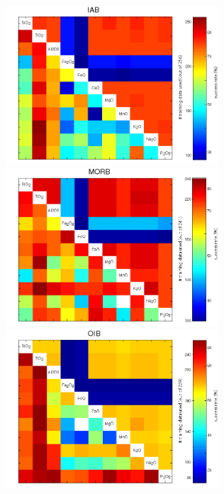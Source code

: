 \begin{figure}[htbp]
  \centering
  \includegraphics[width=300]{figures/xPlotMajor2_linear_IAB.jpg}
  \includegraphics[width=300]{figures/xPlotMajor2_linear_MORB.jpg}\\
  \includegraphics[width=300]{figures/xPlotMajor2_linear_OIB.jpg}

\end{figure}

